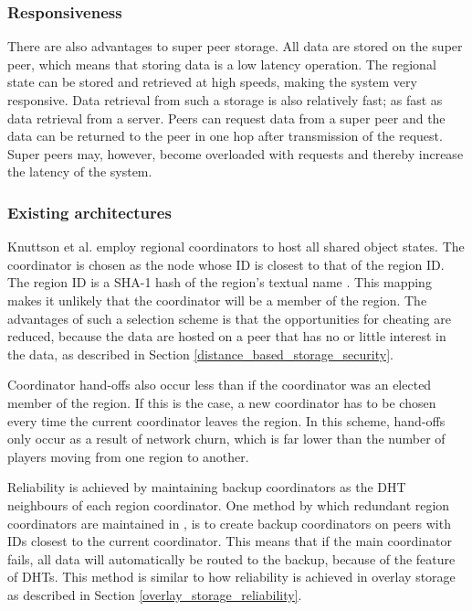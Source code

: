 \documentclass[10pt,a4paper,journal,cspaper,compsoc]{IEEEtran}
\begin{document}
\subsubsection{Responsiveness}
There are also advantages to super peer storage. All data are stored on the super peer, which means that storing data is a low latency operation. The
regional state can be stored and retrieved at high speeds, making the system very responsive. Data retrieval from such a storage is also relatively
fast; as fast as data retrieval from a server. Peers can request data from a super peer and the data can be returned to the peer in one hop after
transmission of the request. Super peers may, however, become overloaded with requests and thereby increase the latency of the system.

\subsubsection{Existing architectures}

Knuttson et al. \cite{knutsson_p2p_first} employ regional coordinators to host all shared object states. The coordinator is chosen as the node whose
ID is closest to that of the region ID. The region ID is a SHA-1 hash of the region's textual name \cite{SHA}. This mapping makes it unlikely that
the coordinator will be a member of the region. The advantages of such a selection scheme is that the opportunities for cheating are reduced, because
the data are hosted on a peer that has no or little interest in the data, as described in Section \ref{distance_based_storage_security}.

Coordinator hand-offs also occur less than if the coordinator was an elected member of the region. If this is the case, a new coordinator has to be
chosen every time the current coordinator leaves the region. In this scheme, hand-offs only occur as a result of network churn, which is far lower
than the number of players moving from one region to another.

Reliability is achieved by maintaining backup coordinators as the \ac{DHT} neighbours of each region coordinator. One method by which redundant
region coordinators are maintained in \cite{knutsson_p2p_first}, is to create backup coordinators on peers with IDs closest to the current
coordinator. This means that if the main coordinator fails, all data will automatically be routed to the backup, because of the feature of \acp{DHT}.
This method is similar to how reliability is achieved in overlay storage as described in Section \ref{overlay_storage_reliability}.
\end{document}
